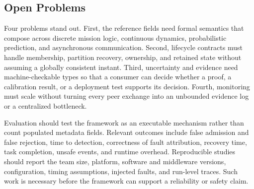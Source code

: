 \subsection{Open Problems}

Four problems stand out.  First, the reference fields need formal semantics that
compose across discrete mission logic, continuous dynamics, probabilistic
prediction, and asynchronous communication.  Second, lifecycle contracts must
handle membership, partition recovery, ownership, and retained state without
assuming a globally consistent instant.  Third, uncertainty and evidence need
machine-checkable types so that a consumer can decide whether a proof, a
calibration result, or a deployment test supports its decision.  Fourth,
monitoring must scale without turning every peer exchange into an unbounded
evidence log or a centralized bottleneck.

Evaluation should test the framework as an executable mechanism rather than
count populated metadata fields.  Relevant outcomes include false admission and
false rejection, time to detection, correctness of fault attribution, recovery
time, task completion, unsafe events, and runtime overhead.  Reproducible studies
should report the team size, platform, software and middleware versions,
configuration, timing assumptions, injected faults, and run-level traces.  Such
work is necessary before the framework can support a reliability or safety
claim.
